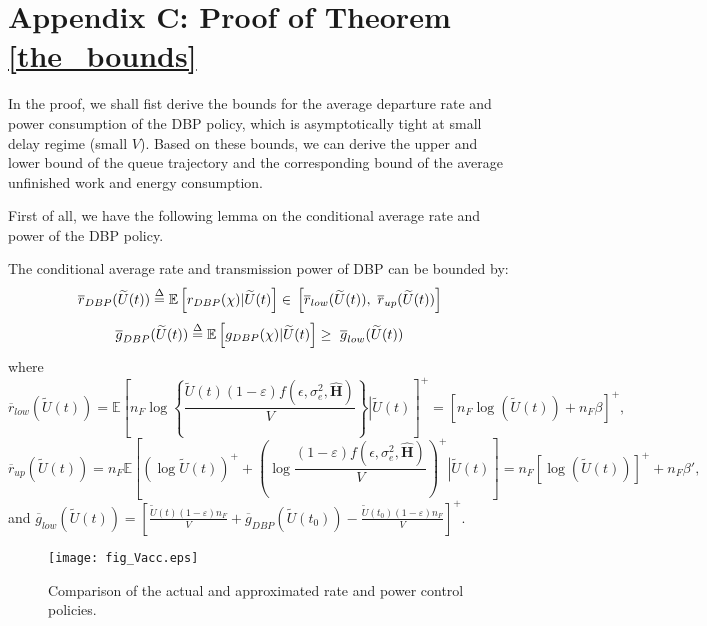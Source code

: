 \documentclass[11pt,journal, onecolumn]{./IEEEtran}
\newcommand{\red}{\color{black}}
\begin{document}
\section*{Appendix C: Proof of Theorem \ref{the_bounds}}\label{app_bounds}
{\red In the proof, we shall fist derive the bounds for the average departure rate and power consumption of the DBP policy, which is asymptotically tight at small delay regime (small $V$). Based on these bounds, we can derive the upper and lower bound of the queue trajectory and the corresponding bound of the average unfinished work and energy consumption.

First of all, we have the following lemma on the conditional average rate and power of the DBP policy.}
\begin{Lemma}\label{lem_approx}
The conditional average rate and transmission power of DBP can be bounded by:
\begin{equation}\label{eq_raprox}
{\overline r _{DBP}}(\widetilde U(t)) \buildrel \Delta \over = \mathbb E\left[ {{r_{DBP}}(\chi )|\widetilde U(t)} \right] \in \,\left[ {{{\overline r }_{low}}(\widetilde U(t)),\,\,{{\overline r }_{up}}(\widetilde U(t))} \right]
\end{equation}
\begin{equation}\label{eq_gaprox}
{\overline g _{DBP}}(\widetilde U(t)) \buildrel \Delta \over = \mathbb E\left[ {{g_{DBP}}(\chi )|\widetilde U(t)} \right] \ge \,\,{\overline g _{low}}(\widetilde U(t))
\end{equation}
where \[{\overline r _{low}}(\widetilde U(t)) = \mathbb E{\left[ {{n_F}\log \left\{ {\frac{{\widetilde U{(t)}(1 - {\varepsilon})f(\epsilon,\sigma_e^2,\mathbf{\hat{H}})}}{V}} \right\}\left| {\widetilde U(t)} \right.} \right]^ + } = {\left[ { {n_F}\log (\widetilde U(t)) + {n_F}\beta } \right]^ + },\]
\begin{equation}\label{eq_rup}
{\overline r _{up}}(\widetilde U(t)) = {n_F}\mathbb E\left[ {{{\left( {\log \widetilde U{(t)}} \right)}^ + } + {{\left( {\log \frac{{(1 - {\varepsilon})f(\epsilon,\sigma_e^2,\mathbf{\hat{H}})}}{V}} \right)}^ + }\left| {\widetilde U(t)} \right.} \right] =  {n_F}{\left[ {\log (\widetilde U(t))} \right]^ + } + {n_F}\beta ',
\end{equation}
and $\overline g_{low}(\widetilde U(t)) = {\left[ {\frac{{{{\widetilde U}(t) }(1 - {\varepsilon}){n_F}}}{V} + \overline g_{DBP}(\widetilde U(t_0)) - \frac{{{{\widetilde U}}(t_0) (1 - {\varepsilon}){n_F}}}{V}} \right]^ + }$. ~\hfill\IEEEQED
\end{Lemma}
\begin{figure}[t!]
\centering
\texttt{[image: fig\_Vacc.eps]}
\caption{Comparison of the actual and approximated rate and power control policies.} \label{fig_Vacc}
\end{figure}
\end{document}
